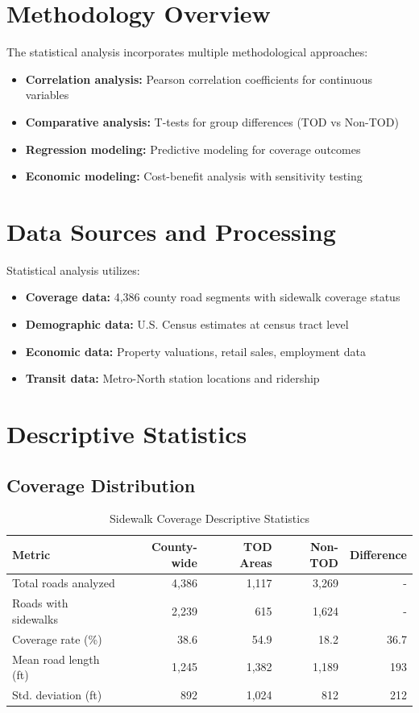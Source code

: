 \documentclass[11pt,letterpaper]{article}
\begin{document}
\section{Methodology Overview}

The statistical analysis incorporates multiple methodological approaches:
\begin{itemize}
    \item \textbf{Correlation analysis:} Pearson correlation coefficients for continuous variables
    \item \textbf{Comparative analysis:} T-tests for group differences (TOD vs Non-TOD)
    \item \textbf{Regression modeling:} Predictive modeling for coverage outcomes
    \item \textbf{Economic modeling:} Cost-benefit analysis with sensitivity testing
\end{itemize}

\section{Data Sources and Processing}

Statistical analysis utilizes:
\begin{itemize}
    \item \textbf{Coverage data:} 4,386 county road segments with sidewalk coverage status
    \item \textbf{Demographic data:} U.S. Census estimates at census tract level
    \item \textbf{Economic data:} Property valuations, retail sales, employment data
    \item \textbf{Transit data:} Metro-North station locations and ridership
\end{itemize}

\section{Descriptive Statistics}

\subsection{Coverage Distribution}

\begin{table}[h]
\centering
\caption{Sidewalk Coverage Descriptive Statistics}
\begin{tabular}{lrrrr}
\toprule
\textbf{Metric} & \textbf{County-wide} & \textbf{TOD Areas} & \textbf{Non-TOD} & \textbf{Difference} \\
\midrule
Total roads analyzed & 4,386 & 1,117 & 3,269 & - \\
Roads with sidewalks & 2,239 & 615 & 1,624 & - \\
Coverage rate (\%) & 38.6 & 54.9 & 18.2 & 36.7 \\
Mean road length (ft) & 1,245 & 1,382 & 1,189 & 193 \\
Std. deviation (ft) & 892 & 1,024 & 812 & 212 \\
\bottomrule
\end{tabular}
\end{table}
\end{document}
